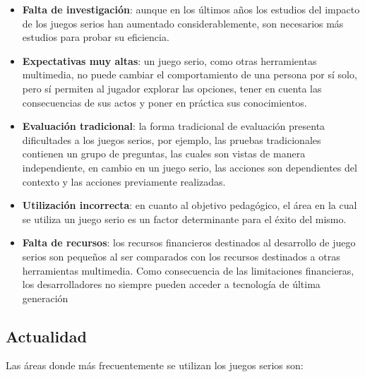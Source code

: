 \begin{itemize}

\item \textbf{Falta de investigación}: aunque en los últimos años los estudios
    del impacto de los juegos serios han aumentado considerablemente, son
    necesarios más estudios para probar su eficiencia\cite{sg:aoverview}.

\item \textbf{Expectativas muy altas}: un juego serio, como otras herramientas
    multimedia, no puede cambiar el comportamiento de una persona por sí solo,
    pero sí permiten al jugador explorar las opciones, tener en cuenta las
    consecuencias de sus actos y poner en práctica sus
    conocimientos\cite{education:games,stapleton2004serious,videojuegos:gonzaleztardon}. 

\item \textbf{Evaluación tradicional}: la forma tradicional de evaluación
    presenta dificultades a los juegos serios, por ejemplo, las pruebas
    tradicionales contienen un grupo de preguntas, las cuales son vistas de
    manera independiente, en cambio en un juego serio, las acciones son
    dependientes del contexto y las acciones previamente
    realizadas\cite{shute2009melding}.

\item \textbf{Utilización incorrecta}: en cuanto al objetivo pedagógico, el área
    en la cual se utiliza un juego serio es un factor determinante para el éxito
    del mismo\cite{stapleton2004serious}.

\item \textbf{Falta de recursos}: los recursos financieros destinados al
    desarrollo de juego serios son pequeños al ser comparados con los recursos
    destinados a otras herramientas
    multimedia\cite{stapleton2004serious,sg:aoverview}. Como consecuencia de las
    limitaciones financieras, los desarrolladores no siempre pueden acceder a
    tecnología de última generación\cite{stapleton2004serious}

\end{itemize}

\subsection{Actualidad}

Las áreas donde más frecuentemente se utilizan los juegos serios son:

